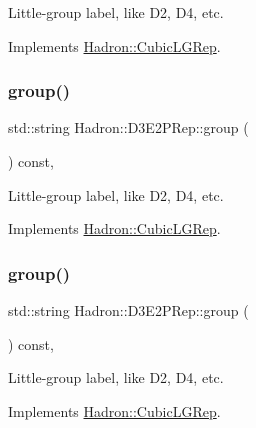 Little-\/group label, like D2, D4, etc. 

Implements \mbox{\hyperlink{structHadron_1_1CubicLGRep_a9bdb14b519a611d21379ed96a3a9eb41}{Hadron\+::\+Cubic\+L\+G\+Rep}}.

\mbox{\label{structHadron_1_1D3E2PRep_aa62b1082d728526868a2269ac65e75aa}} 
\subsubsection{\texorpdfstring{group()}{group()}\hspace{0.1cm}{\footnotesize\ttfamily [2/3]}}
{\footnotesize\ttfamily std\+::string Hadron\+::\+D3\+E2\+P\+Rep\+::group (\begin{DoxyParamCaption}{ }\end{DoxyParamCaption}) const\hspace{0.3cm}{\ttfamily [inline]}, {\ttfamily [virtual]}}

Little-\/group label, like D2, D4, etc. 

Implements \mbox{\hyperlink{structHadron_1_1CubicLGRep_a9bdb14b519a611d21379ed96a3a9eb41}{Hadron\+::\+Cubic\+L\+G\+Rep}}.

\mbox{\label{structHadron_1_1D3E2PRep_aa62b1082d728526868a2269ac65e75aa}} 
\subsubsection{\texorpdfstring{group()}{group()}\hspace{0.1cm}{\footnotesize\ttfamily [3/3]}}
{\footnotesize\ttfamily std\+::string Hadron\+::\+D3\+E2\+P\+Rep\+::group (\begin{DoxyParamCaption}{ }\end{DoxyParamCaption}) const\hspace{0.3cm}{\ttfamily [inline]}, {\ttfamily [virtual]}}

Little-\/group label, like D2, D4, etc. 

Implements \mbox{\hyperlink{structHadron_1_1CubicLGRep_a9bdb14b519a611d21379ed96a3a9eb41}{Hadron\+::\+Cubic\+L\+G\+Rep}}.

\mbox{\label{structHadron_1_1D3E2PRep_aac98f22bbc3837857380501e2fd81b44}} 
